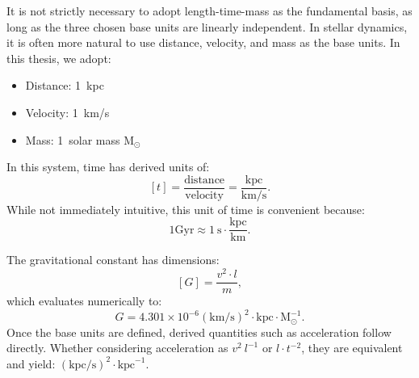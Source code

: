     It is not strictly necessary to adopt length-time-mass as the fundamental basis, as long as the three chosen base units are linearly independent. In stellar dynamics, it is often more natural to use distance, velocity, and mass as the base units. In this thesis, we adopt:
    \begin{itemize}
        \item Distance: 1~kpc
        \item Velocity: 1~km/s 
        \item Mass: 1~solar mass $\mathrm{M}_\odot$
    \end{itemize}

    In this system, time has derived units of:
    \begin{equation}
        \left[t\right] = \frac{\mathrm{distance}}{\mathrm{velocity}} = \frac{\mathrm{kpc}}{\mathrm{km/s}}.
    \end{equation}
    While not immediately intuitive, this unit of time is convenient because:
    \begin{equation}
        1\mathrm{Gyr} \approx 1~\mathrm{s}\cdot\frac{\mathrm{kpc}}{\mathrm{km}}.
    \end{equation}

    The gravitational constant has dimensions:
    \begin{equation}    
        \left[G\right]=\frac{v^2 \cdot l}{m},
    \end{equation} 
    which evaluates numerically to: 
    \begin{equation}
        G = 4.301 \times 10^{-6} \left(\mathrm{km}/\mathrm{s}\right)^2 \cdot \mathrm{kpc} \cdot \mathrm{M}_\odot^{-1}.
    \end{equation}
    Once the base units are defined, derived quantities such as acceleration follow directly. Whether considering acceleration as $v^2~l^{-1}$ or $l \cdot t^{-2}$, they are equivalent and yield: $\left(\mathrm{kpc}/\mathrm{s}\right)^2 \cdot \mathrm{kpc}^{-1}$.

